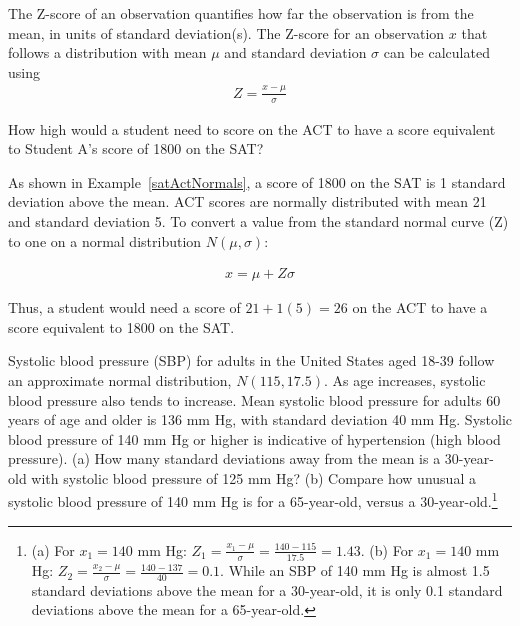 \begin{termBox}{
The Z-score of an observation quantifies how far the observation is from the mean, in units of standard deviation(s). The Z-score for an observation $x$ that follows a distribution with mean $\mu$ and standard deviation $\sigma$ can be calculated using
\begin{align*}
Z = \frac{x-\mu}{\sigma}
\end{align*}}
\end{termBox}

\begin{example}
{How high would a student need to score on the ACT to have a score equivalent to Student A's score of 1800 on the SAT?} 

As shown in Example~\ref{satActNormals}, a score of 1800 on the SAT is 1 standard deviation above the mean. ACT scores are normally distributed with mean 21 and standard deviation 5. To convert a value from the standard normal curve (Z) to one on a normal distribution $N(\mu, \sigma)$:

\begin{align*}
x = \mu + Z\sigma
\end{align*}

Thus, a student would need a score of $21 + 1(5) = 26$ on the ACT to have a score equivalent to 1800 on the SAT. 
\end{example}

\begin{exercise} \label{nhanes_bp}
Systolic blood pressure (SBP) for adults in the United States aged 18-39 follow an approximate normal distribution, $N(115, 17.5)$. As age increases, systolic blood pressure also tends to increase. Mean systolic blood pressure for adults 60 years of age and older is 136 mm Hg, with standard deviation 40 mm Hg. Systolic blood pressure of 140 mm Hg or higher is indicative of hypertension (high blood pressure). 
(a) How many standard deviations away from the mean is a 30-year-old with systolic blood pressure of 125 mm Hg? (b) Compare how unusual a systolic blood pressure of 140 mm Hg is for a 65-year-old, versus a 30-year-old.\footnote{(a) For $x_1=140$ mm Hg: $Z_1 = \frac{x_1 - \mu}{\sigma} = \frac{140 - 115}{17.5} = 1.43$. (b) For $x_1=140$ mm Hg: $Z_2 = \frac{x_2 - \mu}{\sigma} = \frac{140 - 137}{40} = 0.1$. While an SBP of 140 mm Hg is almost 1.5 standard deviations above the mean for a 30-year-old, it is only 0.1 standard deviations above the mean for a 65-year-old.}
\end{exercise} 

